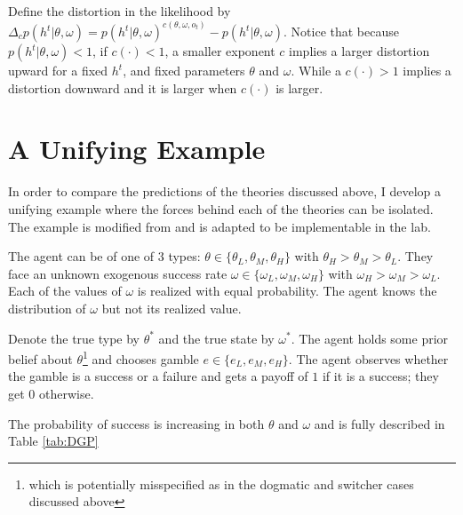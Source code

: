 \documentclass[
  12pt,
]{article}
\begin{document}
Define the distortion in the likelihood by
\(\Delta_c p(h^t|\theta, \omega) = p(h^t|\theta, \omega)^{c(\theta, \omega, o_t)} - p(h^t|\theta, \omega)\).
Notice that because \(p(h^t|\theta, \omega)<1\), if \(c(\cdot)<1\), a
smaller exponent \(c\) implies a larger distortion upward for a fixed
\(h^t\), and fixed parameters \(\theta\) and \(\omega\). While a
\(c(\cdot)>1\) implies a distortion downward and it is larger when
\(c(\cdot)\) is larger.

\hypertarget{a-unifying-example}{%
\section{A Unifying Example}\label{a-unifying-example}}

In order to compare the predictions of the theories discussed above, I
develop a unifying example where the forces behind each of the theories
can be isolated. The example is modified from \citet{Heidhues2018} and
is adapted to be implementable in the lab.

The agent can be of one of 3 types:
\(\theta \in \{\theta_L, \theta_M, \theta_H\}\) with
\(\theta_H > \theta_M > \theta_L\). They face an unknown exogenous
success rate \(\omega \in \{\omega_L, \omega_M, \omega_H\}\) with
\(\omega_H>\omega_M>\omega_L\). Each of the values of \(\omega\) is
realized with equal probability. The agent knows the distribution of
\(\omega\) but not its realized value.

Denote the true type by \(\theta^*\) and the true state by \(\omega^*\).
The agent holds some prior belief about
\(\theta\)\footnote{which is potentially misspecified as in the dogmatic and switcher cases discussed above}
and chooses gamble \(e \in \{e_L, e_M, e_H\}\). The agent observes
whether the gamble is a success or a failure and gets a payoff of \(1\)
if it is a success; they get \(0\) otherwise.

The probability of success is increasing in both \(\theta\) and
\(\omega\) and is fully described in Table \ref{tab:DGP}
\end{document}
